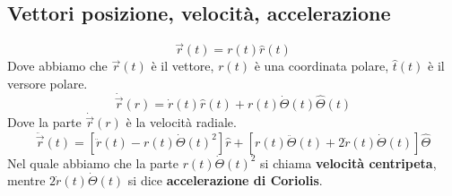 \subsection*{Vettori posizione, velocità, accelerazione}
$$\vec{r}(t) = r(t)\hat{r}(t)$$
Dove abbiamo che $\vec{r}(t)$ è il vettore, $r(t)$ è una coordinata polare, $\hat{t}(t)$ è il versore polare.
$$\dot{\vec{r}}(r) = \dot{r}(t)\hat{r}(t) + r(t)\dot{\Theta}(t)\hat{\Theta}(t)$$
Dove la parte $\dot{\vec{r}}(r)$ è la velocità radiale.
$$\ddot{\vec{r}}(t) = [\ddot{r}(t) - r(t)\dot{\Theta}(t)^2] \hat{r} + [r(t) \ddot{\Theta}(t) + 2\dot{r}(t)\dot{\Theta}(t)]\hat{\Theta}$$
Nel quale abbiamo che la parte $r(t)\dot{\Theta}(t)^2$ si chiama \textbf{velocità centripeta}, mentre $2\dot{r}(t)\dot{\Theta}(t)$ si dice \textbf{accelerazione di Coriolis}.

